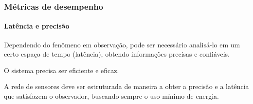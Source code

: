 \documentclass[notes]{beamer}
\begin{document}
\begin{frame}
\frametitle{Métricas de desempenho}
\framesubtitle{Latência e precisão}

\begin{block}

Dependendo do fenômeno em observação, pode ser necessário analisá-lo em um certo espaço de tempo (latência), obtendo informações precisas e confiáveis. 
\end{block} \pause

\begin{block}

O sistema precisa ser eficiente e eficaz.
\end{block} \pause

\begin{block}

A rede de sensores deve ser estruturada de maneira a obter a precisão e a latência que satisfazem o observador, buscando sempre o uso mínimo de energia. 

\end{block}

\end{frame}
\end{document}
